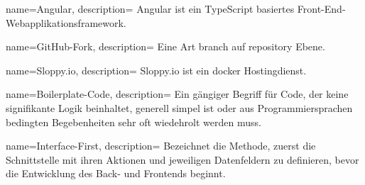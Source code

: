 {
	name=Angular,
	description={
		Angular ist ein TypeScript basiertes Front-End-Webapplikationsframework.\cite{Angular}
	}
}

{
	name=GitHub-Fork,
	description={
		Eine Art \gls{branch} auf \gls{repository} Ebene.\cite{Github-Fork}
	}
}

{
	name=Sloppy.io,
	description={
		Sloppy.io ist ein \gls{docker} Hostingdienst.
	}
}

{
	name=Boilerplate-Code,
	description={
		Ein gängiger Begriff für Code, der keine signifikante Logik beinhaltet, generell simpel ist oder aus Programmiersprachen bedingten Begebenheiten sehr oft wiedehrolt werden muss.
	}
}

{
	name=Interface-First,
	description={
		Bezeichnet die Methode, zuerst die Schnittstelle mit ihren Aktionen und jeweiligen Datenfeldern zu definieren, bevor die Entwicklung des Back- und Frontends beginnt.
	}
}
